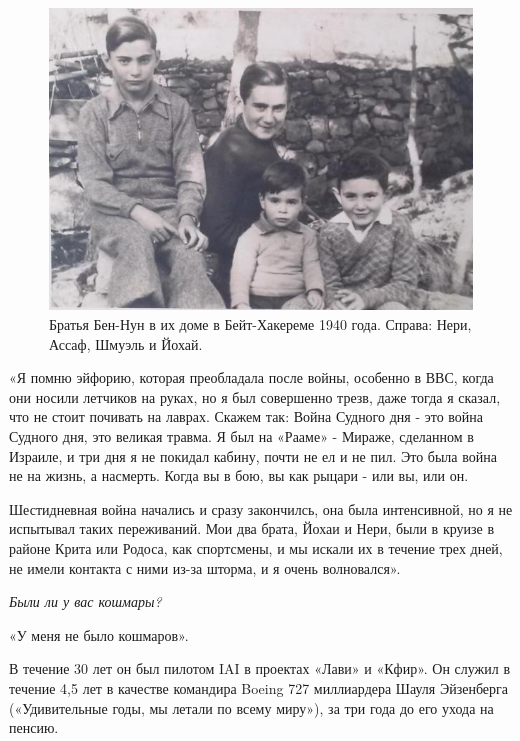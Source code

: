 \begin{figure}[h!tb] 
	\centering\includegraphics[scale=0.6]{History_BenNun/OfI9-eAh-Ag.jpg}
	\caption{Братья Бен-Нун в их доме в Бейт-Хакереме 1940 года. Справа: Нери, Ассаф, Шмуэль и Йохай. }%
\end{figure}

«Я помню эйфорию, которая преобладала после войны, особенно в ВВС, когда они носили летчиков на руках, но я был совершенно трезв, даже тогда я сказал, что не стоит почивать на лаврах. Скажем так: Война Судного дня - это война Судного дня, это великая травма. Я был на «Рааме» - Мираже, сделанном в Израиле, и три дня я не покидал кабину, почти не ел и не пил. Это была война не на жизнь, а насмерть. Когда вы в бою, вы как рыцари - или вы, или он.

Шестидневная война начались и сразу закончилсь, она была интенсивной, но я не испытывал таких переживаний. Мои два брата, Йохаи и Нери, были в круизе в районе Крита или Родоса, как спортсмены, и мы искали их в течение трех дней, не имели контакта с ними из-за шторма, и я очень волновался».

\textit{Были ли у вас кошмары?}

«У меня не было кошмаров».

В течение 30 лет он был пилотом IAI в проектах «Лави» и «Кфир». Он служил в течение 4,5 лет в качестве командира Boeing 727 миллиардера Шауля Эйзенберга («Удивительные годы, мы летали по всему миру»), за три года до его ухода на пенсию.

